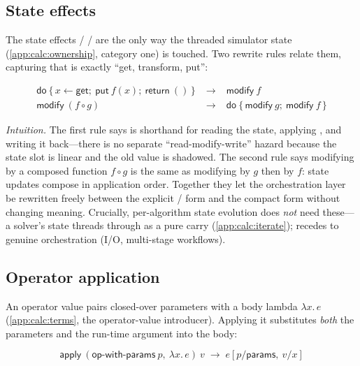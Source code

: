 \subsection{State effects}
\label{app:calc:state}

The state effects  /  /  are the only way the
threaded simulator state (\cref{app:calc:ownership}, category one) is touched.
Two rewrite rules relate them, capturing that  is exactly
``get, transform, put'':

\[
\begin{array}{rcl}
\textsf{do}\ \{\, x \leftarrow \textsf{get};\ \textsf{put}\ f(x);\ \textsf{return}\ ()\,\}
  &\;\to\;& \textsf{modify}\ f \\[3pt]
\textsf{modify}\ (f \circ g) &\;\to\;& \textsf{do}\ \{\,\textsf{modify}\ g;\ \textsf{modify}\ f\,\}
\end{array}
\]

\noindent \emph{Intuition.} The first rule says  is shorthand for
reading the state, applying , and writing it back---there is no separate
``read-modify-write'' hazard because the state slot is linear and the old value is
shadowed. The second rule says modifying by a composed function $f \circ g$ is the
same as modifying by $g$ then by $f$: state updates compose in application order.
Together they let the orchestration layer be rewritten freely between the explicit
/ form and the compact  form without changing
meaning. Crucially, per-algorithm state evolution does \emph{not} need these---a
solver's state threads through  as a pure carry
(\cref{app:calc:iterate});  recedes to genuine orchestration (I/O,
multi-stage workflows).

\subsection{Operator application}
\label{app:calc:apply}

An operator value pairs closed-over parameters  with a body lambda
$\lambda x.\, e$ (\cref{app:calc:terms}, the operator-value introducer). Applying
it substitutes \emph{both} the parameters and the run-time argument into the body:

\[
\textsf{apply}\ (\textsf{op-with-params}\ p,\ \lambda x.\, e)\ v
  \;\to\; e[p/\textsf{params},\ v/x]
\]

